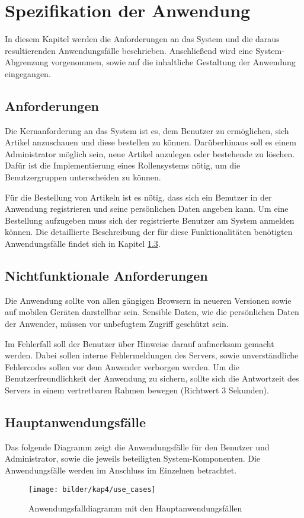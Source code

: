 \section{Spezifikation der Anwendung}\label{specification}
In diesem Kapitel werden die Anforderungen an das System und die daraus resultierenden Anwendungsfälle beschrieben.
Anschließend wird eine System-Abgrenzung vorgenommen, sowie auf die inhaltliche Gestaltung der Anwendung eingegangen.

\subsection{Anforderungen}
Die Kernanforderung an das System ist es, dem Benutzer zu ermöglichen, sich Artikel anzuschauen und diese bestellen zu können.
Darüberhinaus soll es einem Administrator möglich sein, neue Artikel anzulegen oder bestehende zu löschen.
Dafür ist die Implementierung eines Rollensystems nötig, um die Benutzergruppen unterscheiden zu können.

Für die Bestellung von Artikeln ist es nötig, dass sich ein Benutzer in der Anwendung registrieren und seine persönlichen Daten angeben kann.
Um eine Bestellung aufzugeben muss sich der registrierte Benutzer am System anmelden können.
Die detaillierte Beschreibung der für diese Funktionalitäten benötigten Anwendungsfälle findet sich in Kapitel \ref{usecases}.
\subsection{Nichtfunktionale Anforderungen}
Die Anwendung sollte von allen gängigen Browsern in neueren Versionen sowie auf mobilen Geräten darstellbar sein.
Sensible Daten, wie die persönlichen Daten der Anwender, müssen vor unbefugtem Zugriff geschützt sein.

Im Fehlerfall soll der Benutzer über Hinweise darauf aufmerksam gemacht werden.
Dabei sollen interne Fehlermeldungen des Servers, sowie unverständliche Fehlercodes sollen vor dem Anwender verborgen werden.
Um die Benutzerfreundlichkeit der Anwendung zu sichern, sollte sich die Antwortzeit des Servers in einem vertretbaren Rahmen bewegen (Richtwert 3 Sekunden).
\subsection{Hauptanwendungsfälle}\label{usecases}
Das folgende Diagramm zeigt die Anwendungsfälle für den Benutzer und Administrator, sowie die jeweils beteiligten System-Komponenten.
Die Anwendungsfälle werden im Anschluss im Einzelnen betrachtet.
\begin{figure}[ht!]
	\centering
	\texttt{[image: bilder/kap4/use\_cases]}
	\caption{Anwendungsfalldiagramm mit den Hauptanwendungsfällen}
	\label{fig:usecases}
\end{figure}

